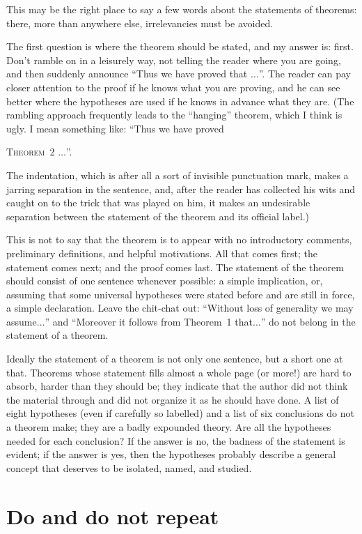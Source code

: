 \documentclass[12pt]{article}
\begin{document}
This may be the right place to say a few words about the statements of theorems: there, more than anywhere else, irrelevancies must be avoided. 

The first question is where the theorem should be stated, and my answer is: first. Don't ramble on in a leisurely way, not telling the reader where you are going, and then suddenly announce ``Thus we have proved that $\dots$''. The reader can pay closer attention to the proof if he knows what you are proving, and he can see better where the hypotheses are used if he knows in advance what they are. (The rambling approach frequently leads to the ``hanging'' theorem, which I think is ugly. I mean something like: ``Thus we have proved
\begin{center}
    \textsc{Theorem~2} $\dots$''. 
\end{center}
The indentation, which is after all a sort of invisible punctuation mark, makes a jarring separation in the sentence, and, after the reader has collected his wits and caught on to the trick that was played on him, it makes an undesirable separation between the statement of the theorem and its official label.)

This is not to say that the theorem is to appear with no introductory comments, preliminary definitions, and helpful motivations. All that comes first; the statement comes next; and the proof comes last. The statement of the theorem should consist of one sentence whenever possible: a simple implication, or, assuming that some universal hypotheses were stated before and are still in force, a simple declaration. Leave the chit-chat out: ``Without loss of generality we may assume$\dots$'' and ``Moreover it follows from Theorem~1 that$\dots$'' do not belong in the statement of a theorem. 

Ideally the statement of a theorem is not only one sentence, but a short one at that. Theorems whose statement fills almost a whole page (or more!) are hard to absorb, harder than they should be; they indicate that the author did not think the material through and did not organize it as he should have done. A list of eight hypotheses (even if carefully so labelled) and a list of six conclusions do not a theorem make; they are a badly expounded theory. Are all the hypotheses needed for each conclusion? If the answer is no, the badness of the statement is evident; if the answer is yes, then the hypotheses probably describe a general concept that deserves to be isolated, named, and studied. 

\section{Do and do not repeat}
\end{document}
